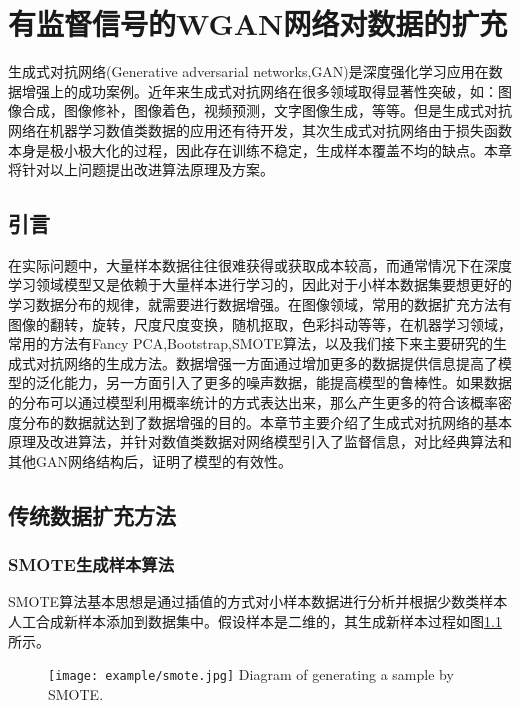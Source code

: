 \chapter{有监督信号的WGAN网络对数据的扩充}
生成式对抗网络(Generative adversarial networks,GAN)\cite{Goodfellow2017NIPS}是深度强化学习应用在数据增强上的成功案例。近年来生成式对抗网络在很多领域取得显著性突破，如：图像合成，图像修补，图像着色，视频预测，文字图像生成，等等。但是生成式对抗网络在机器学习数值类数据的应用还有待开发，其次生成式对抗网络由于损失函数本身是极小极大化的过程，因此存在训练不稳定，生成样本覆盖不均的缺点。本章将针对以上问题提出改进算法原理及方案。
\section{引言}
在实际问题中，大量样本数据往往很难获得或获取成本较高，而通常情况下在深度学习领域模型又是依赖于大量样本进行学习的，因此对于小样本数据集要想更好的学习数据分布的规律，就需要进行数据增强。在图像领域，常用的数据扩充方法有图像的翻转，旋转，尺度尺度变换，随机抠取，色彩抖动等等，在机器学习领域，常用的方法有Fancy PCA\cite{Holdt2010Genome},Bootstrap,SMOTE算法，以及我们接下来主要研究的生成式对抗网络的生成方法。数据增强一方面通过增加更多的数据提供信息提高了模型的泛化能力，另一方面引入了更多的噪声数据，能提高模型的鲁棒性。如果数据的分布可以通过模型利用概率统计的方式表达出来，那么产生更多的符合该概率密度分布的数据就达到了数据增强的目的。本章节主要介绍了生成式对抗网络的基本原理及改进算法，并针对数值类数据对网络模型引入了监督信息，对比经典算法和其他GAN网络结构后，证明了模型的有效性。
\section{传统数据扩充方法}
\subsection{SMOTE生成样本算法}
SMOTE算法基本思想是通过插值的方式对小样本数据进行分析并根据少数类样本人工合成新样本添加到数据集中。假设样本是二维的，其生成新样本过程如图\ref{fig:smote}所示。
\begin{figure}[htbp]
	\centering
	\texttt{[image: example/smote.jpg]}
	{Diagram of generating a sample by SMOTE.}
	\label{fig:smote}
\end{figure}

